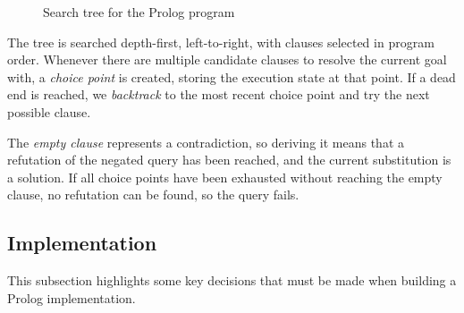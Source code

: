 \begin{figure}[H]
\begin{center}
\end{center}
\caption{Search tree for the Prolog program}
\label{fig:prolog-search-tree}
\end{figure}

The tree is searched depth-first, left-to-right, with clauses selected in program order. Whenever there are multiple candidate clauses to resolve the current goal with, a \emph{choice point} is created, storing the execution state at that point. If a dead end is reached, we \emph{backtrack} to the most recent choice point and try the next possible clause.

The \emph{empty clause} represents a contradiction, so deriving it means that a refutation of the negated query has been reached, and the current substitution is a solution. If all choice points have been exhausted without reaching the empty clause, no refutation can be found, so the query fails.

\subsection{Implementation}

\label{sec:preparation-implementation}

This subsection highlights some key decisions that must be made when building a Prolog implementation.

